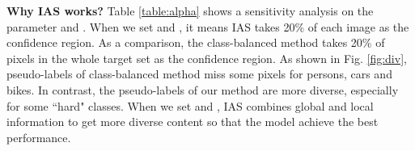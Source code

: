 \documentclass[runningheads]{llncs}
\begin{document}
\noindent\textbf{Why IAS works?} Table \ref{table:alpha} shows a sensitivity analysis on the parameter  and . When we set  and , it means IAS takes 20\% of each image as the confidence region. As a comparison, the class-balanced method \cite{zou2018unsupervised} takes 20\% of pixels in the whole target set as the confidence region. As shown in Fig. \ref{fig:div}, pseudo-labels of class-balanced method miss some pixels for persons, cars and bikes. In contrast, the pseudo-labels of our method are more diverse, especially for some ``hard" classes. When we set  and , IAS combines global and local information to get more diverse content so that the model achieve the best performance.

\begin{table}[htb]
\scriptsize
\parbox{.46\linewidth}{
\caption{ and  sensitivity analysis (GTA5 to Cityscapes)}
}
\end{table}
\end{document}
